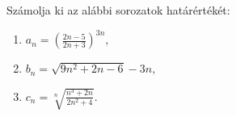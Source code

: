 \documentclass[11pt]{scrartcl}
\begin{document}
Számolja ki az alábbi sorozatok határértékét:
\begin{enumerate}
	\item \(\displaystyle
	      a_n = \left(
	      \frac{2n - 5}{2n + 3}
	      \right)^{3n},
	      \)

	\item \(\displaystyle
	      b_n = \sqrt{9n^2 + 2n - 6} - 3n,
	      \)

	\item \(\displaystyle
	      c_n = \sqrt[n]{\frac{n^3 + 2n}{2n^2 + 4}}.
	      \)
\end{enumerate}
\end{document}
